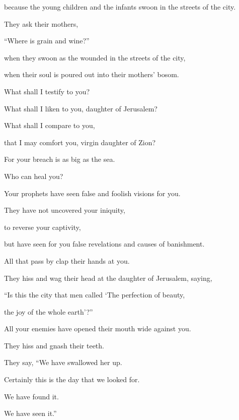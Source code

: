 {\par }{\QB because the young children and the infants swoon in the streets of the city.
\par }{\BB \par }{\Q {}They ask their mothers,
\par }{\QB “Where is grain and wine?”
\par }{\QB when they swoon as the wounded in the streets of the city,
\par }{\QB when their soul is poured out into their mothers’ bosom.
\par }{\BB \par }{\Q {}What shall I testify to you?
\par }{\QB What shall I liken to you, daughter of Jerusalem?
\par }{\Q What shall I compare to you,
\par }{\QB that I may comfort you, virgin daughter of Zion?
\par }{\Q For your breach is as big as the sea.
\par }{\QB Who can heal you?
\par }{\BB \par }{\Q {}Your prophets have seen false and foolish visions for you.
\par }{\QB They have not uncovered your iniquity,
\par }{\QB to reverse your captivity,
\par }{\QB but have seen for you false revelations and causes of banishment.
\par }{\BB \par }{\Q {}All that pass by clap their hands at you.
\par }{\QB They hiss and wag their head at the daughter of Jerusalem, saying,
\par }{\Q “Is this the city that men called ‘The perfection of beauty,
\par }{\QB the joy of the whole earth’?”
\par }{\BB \par }{\Q {}All your enemies have opened their mouth wide against you.
\par }{\QB They hiss and gnash their teeth.
\par }{\QB They say, “We have swallowed her up.
\par }{\Q Certainly this is the day that we looked for.
\par }{\QB We have found it.
\par }{\QB We have seen it.”
}
